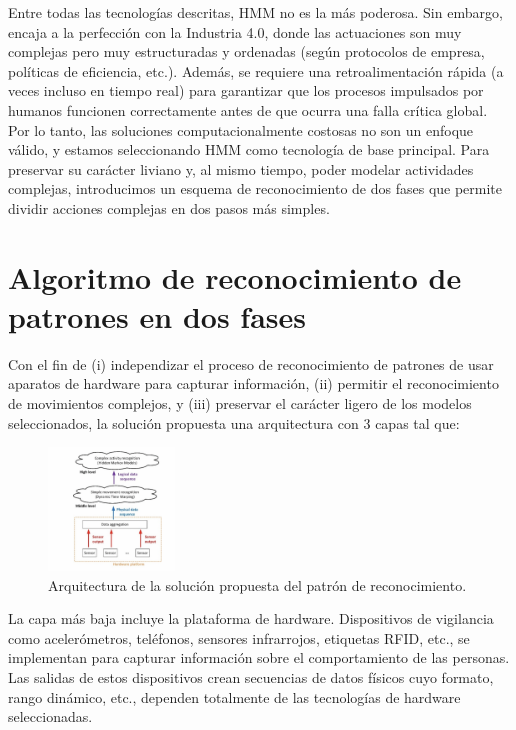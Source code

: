 \documentclass{article}
\begin{document}
  Entre todas las tecnologías descritas, HMM no es la más poderosa. Sin embargo, encaja a la perfección con la Industria 4.0, donde las actuaciones son muy complejas pero muy estructuradas y ordenadas (según protocolos de empresa, políticas de eficiencia, etc.). Además, se requiere una retroalimentación rápida (a veces incluso en tiempo real) para garantizar que los procesos impulsados por humanos funcionen correctamente antes de que ocurra una falla crítica global. Por lo tanto, las soluciones computacionalmente costosas no son un enfoque válido, y estamos seleccionando HMM como tecnología de base principal. Para preservar su carácter liviano y, al mismo tiempo, poder modelar actividades complejas, introducimos un esquema de reconocimiento de dos fases que permite dividir acciones complejas en dos pasos más simples.
\section {Algoritmo de reconocimiento de patrones en dos fases}

  Con el fin de (i) independizar el proceso de reconocimiento de patrones de usar aparatos de hardware para capturar información, (ii) permitir el reconocimiento de movimientos complejos, y (iii) preservar el carácter ligero de los modelos seleccionados, la solución propuesta una arquitectura con 3 capas tal que:


\begin{figure}[h]
	\centering
	\includegraphics[width=0.3\textwidth]{punto3.png}
	\caption{\label{fig:frog}Arquitectura de la solución propuesta del patrón de reconocimiento.}
\end{figure}

  La capa más baja incluye la plataforma de hardware. Dispositivos de vigilancia como acelerómetros, teléfonos, sensores infrarrojos, etiquetas RFID, etc., se implementan para capturar información sobre el comportamiento de las personas. Las salidas de estos dispositivos crean secuencias de datos físicos cuyo formato, rango dinámico, etc., dependen totalmente de las tecnologías de hardware seleccionadas.
\end{document}
